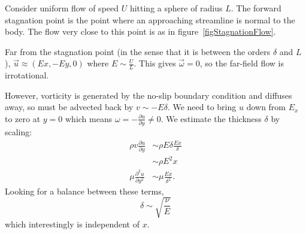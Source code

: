 \documentclass[../Main.tex]{subfiles}
\begin{document}
\begin{example}
    \label{exStagnationPoint}
    Consider uniform flow of speed $U$ hitting a sphere of radius $L$. The forward stagnation point is the point where an approaching streamline is normal to the body. The flow very close to this point is as in figure~\ref{figStagnationFlow}.

    Far from the stagnation point (in the sense that it is between the orders $\delta$ and $L$), $\vec u \approx (Ex, -Ey, 0)$ where $E \sim \frac{U}{L}$. This gives $\vec \omega = 0$, so the far-field flow is irrotational.

    However, vorticity is generated by the no-slip boundary condition and diffuses away, so must be advected back by $v \sim -E\delta$. We need to bring $u$ down from $E_x$ to zero at $y = 0$ which means $\omega = -\frac{\partial u}{\partial y} \neq 0$. We estimate the thickness $\delta$ by scaling:
    \begin{align*}
        \rho v \frac{\partial u}{\partial y} &\sim \rho E \delta \frac{Ex}{\delta} \\
        &\sim \rho E^2x \\
        \mu \frac{\partial^{2}u}{\partial y^{2}} &\sim \mu \frac{Ex}{\delta^2}.
    \end{align*}
    Looking for a balance between these terms,
    \begin{equation*}
        \delta \sim \sqrt{\frac{\nu}{E}}
    \end{equation*}
    which interestingly is independent of $x$.


\end{example}
\end{document}
